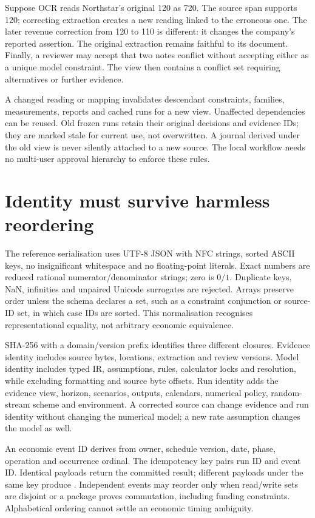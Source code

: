 Suppose OCR reads Northstar's original 120 as 720. The source span supports
120; correcting extraction creates a new reading linked to the erroneous
one. The later revenue correction from 120 to 110 is different: it changes
the company's reported assertion. The original extraction remains faithful
to its document. Finally, a reviewer may accept that two notes conflict
without accepting either as a unique model constraint. The view then contains
a conflict set requiring alternatives or further evidence.

A changed reading or mapping invalidates descendant constraints, families,
measurements, reports and cached runs for a new view. Unaffected dependencies
can be reused. Old frozen runs retain their original decisions and evidence
IDs; they are marked stale for current use, not overwritten. A journal derived
under the old view is never silently attached to a new source. The local
workflow needs no multi-user approval hierarchy to enforce these rules.

\section{Identity must survive harmless reordering}

The reference serialisation uses UTF-8 JSON with NFC strings, sorted ASCII
keys, no insignificant whitespace and no floating-point literals. Exact
numbers are reduced rational numerator/denominator strings; zero is $0/1$.
Duplicate keys, NaN, infinities and unpaired Unicode surrogates are rejected.
Arrays preserve order unless the schema declares a set, such as a constraint
conjunction or source-ID set, in which case IDs are sorted. This normalisation
recognises representational equality, not arbitrary economic equivalence.

SHA-256 with a domain/version prefix identifies three different closures.
Evidence identity includes source bytes, locations, extraction and review
versions. Model identity includes typed IR, assumptions, rules, calculator
locks and resolution, while excluding formatting and source byte offsets.
Run identity adds the evidence view, horizon, scenarios, outputs, calendars,
numerical policy, random-stream scheme and environment. A corrected
source can change evidence and run identity without changing the numerical
model; a new rate assumption changes the model as well.

An economic event ID derives from owner, schedule version, date, phase,
operation and occurrence ordinal. The idempotency key pairs run ID and event
ID. Identical payloads return the committed result; different payloads under
the same key produce . Independent events
may reorder only when read/write sets are disjoint or a package proves
commutation, including funding constraints. Alphabetical ordering cannot
settle an economic timing ambiguity.

